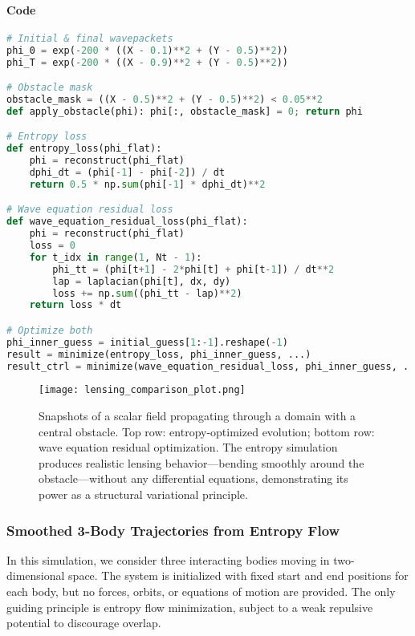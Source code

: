 \documentclass[12pt]{article}
\begin{document}
\paragraph*{Code}\mbox{}
\begin{lstlisting}[language=Python]
# Initial & final wavepackets
phi_0 = exp(-200 * ((X - 0.1)**2 + (Y - 0.5)**2))
phi_T = exp(-200 * ((X - 0.9)**2 + (Y - 0.5)**2))

# Obstacle mask
obstacle_mask = ((X - 0.5)**2 + (Y - 0.5)**2) < 0.05**2
def apply_obstacle(phi): phi[:, obstacle_mask] = 0; return phi

# Entropy loss
def entropy_loss(phi_flat):
    phi = reconstruct(phi_flat)
    dphi_dt = (phi[-1] - phi[-2]) / dt
    return 0.5 * np.sum(phi[-1] * dphi_dt)**2

# Wave equation residual loss
def wave_equation_residual_loss(phi_flat):
    phi = reconstruct(phi_flat)
    loss = 0
    for t_idx in range(1, Nt - 1):
        phi_tt = (phi[t+1] - 2*phi[t] + phi[t-1]) / dt**2
        lap = laplacian(phi[t], dx, dy)
        loss += np.sum((phi_tt - lap)**2)
    return loss * dt

# Optimize both
phi_inner_guess = initial_guess[1:-1].reshape(-1)
result = minimize(entropy_loss, phi_inner_guess, ...)
result_ctrl = minimize(wave_equation_residual_loss, phi_inner_guess, ...)
\end{lstlisting}

\begin{figure}[H]
\centering
\texttt{[image: lensing\_comparison\_plot.png]}
\caption{
Snapshots of a scalar field propagating through a domain with a central obstacle. Top row: entropy-optimized evolution; bottom row: wave equation residual optimization. The entropy simulation produces realistic lensing behavior—bending smoothly around the obstacle—without any differential equations, demonstrating its power as a structural variational principle.
}
\end{figure}


\subsubsection{Smoothed 3-Body Trajectories from Entropy Flow}

In this simulation, we consider three interacting bodies moving in two-dimensional space. The system is initialized with fixed start and end positions for each body, but no forces, orbits, or equations of motion are provided. The only guiding principle is entropy flow minimization, subject to a weak repulsive potential to discourage overlap.
\end{document}
